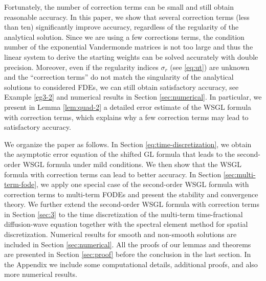 \documentclass[10pt]{siamltex}
\begin{document}
Fortunately, the number of correction terms can be small and still obtain reasonable accuracy.
In this paper, we show   that several correction terms (less than ten) significantly improve  accuracy, regardless of
the regularity of the analytical solution.
Since we are using a few corrections terms, the condition number of the exponential Vandermonde matrices
is not too large and thus the linear system to derive the starting weights can be
solved accurately with double precision.
Moreover, even if the regularity indices $\sigma_r$ (see \eqref{eq:ut}) are unknown and the ``correction terms'' do not match the singularity of the analytical solutions to considered FDEs, we can still obtain
satisfactory accuracy, see  Example \ref{eg3-2}  and numerical results in Section \ref{sec:numerical}.
In particular, we present in Lemma \ref{lem:quad-2} a detailed error estimate of
the WSGL formula with correction terms, which explains why a few correction terms may lead to satisfactory accuracy.


We organize the paper as follows.
In Section \ref{eq:time-discretization}, we obtain the asymptotic error equation of the shifted
GL formula that leads to the second-order WSGL formula under mild conditions.
We then show that the WSGL formula with correction terms can lead to better accuracy.
In Section \ref{sec:multi-term-fode}, we apply one special case of the second-order WSGL formula
with correction terms to  multi-term FODEs and present the stability and convergence theory.
We further extend the second-order WSGL formula
with correction terms in Section \ref{sec:3} to the time discretization of
the multi-term time-fractional diffusion-wave equation together
with the spectral element method for spatial discretization.
Numerical results for smooth and  non-smooth solutions are included in Section \ref{sec:numerical}.
All the proofs of our lemmas and theorems are presented in Section \ref{sec:proof} before the conclusion in the last section.
In the Appendix we include some computational details, additional proofs, and also more numerical results.

\end{document}
